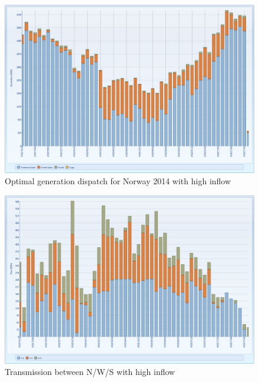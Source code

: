\documentclass{article}
\begin{document}
\begin{figure}[htbp]
\begin{center}
\includegraphics[width=13cm,keepaspectratio=true]{figures/wetcase/MTgenerationNwet}
\caption{Optimal generation dispatch for Norway 2014 with high inflow}
\label{fig:MTgenerationNwet}
\end{center}
\end{figure}
\begin{figure}[htbp]
\begin{center}
\includegraphics[width=13cm,keepaspectratio=true]{figures/wetcase/MTnodetransmissionwet}
\caption{Transmission between N/W/S with high inflow}
\label{fig:MTnodetransmissionwet}
\end{center}
\end{figure}
\end{document}
